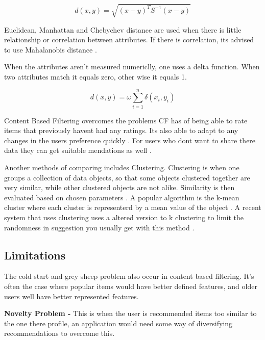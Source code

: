\begin{equation}
	d(x,y) = \sqrt{ ( x - y )^{ T } S^{ -1 } ( x - y ) }
\end{equation}

Euclidean, Manhattan and Chebychev distance are used when there is little relationship or correlation between attributes. If there is correlation, its advised to use Mahalanobis distance \citep{celma_recommendation_2010}.

When the attributes aren't measured numericlly, one uses a delta function. When two attributes match it equals zero, other wise it equals 1.

\begin{equation}
	d(x,y) = \omega \sum _{ i = 1 } ^{ n } \delta (x _{i}, y _{i})
\end{equation}

Content Based Filtering overcomes the problems CF has of being able to rate items that previously havent had any ratings. Its also able to adapt to any changes in the users preference quickly \citep{isinkaye_recommendation_2015}. For users who dont want to share there data they can get suitable mendations as well \citep{k_you_2006}.

Another methods of comparing includes Clustering. Clustering is when one  groups a collection of data objects, so that some objects clustered together are very similar, while other clustered objects are not alike. Similarity is then evaluated based on chosen parameters \citep{ferretti_clustering_2018}. A popular algorithm is the k-mean cluster where each cluster is representerd by a mean value of the object \citep{han_data_2006}. A recent system that uses clustering uses a altered version to k clustering to limit the randomness in suggestion you usually get with this method \citep{chang_personalized_2017}.



\subsection{Limitations}
The cold start and grey sheep problem also occur in content based filtering. It's often the case where popular items would have better defined features, and older users well have better represented features.

\textbf{Novelty Problem - } This is when the user is recommended items too similar to the one there profile, an application would need some way of diversifying recommendations to overcome this.

